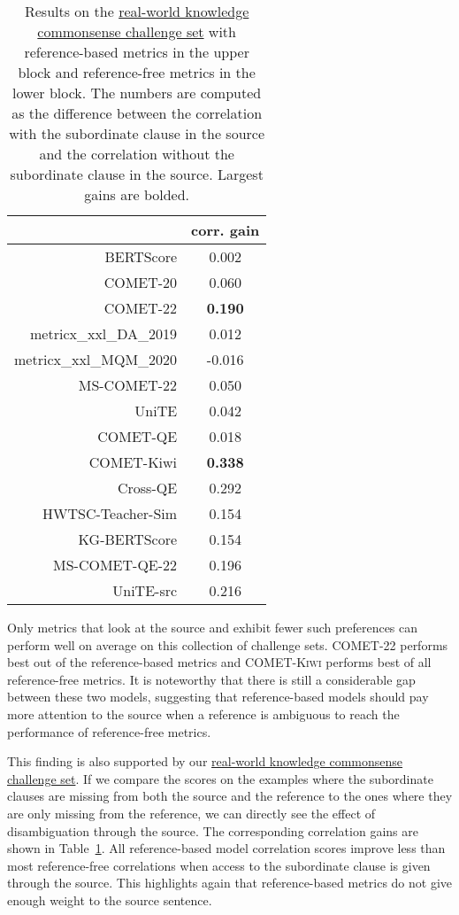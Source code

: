\documentclass[11pt]{article}
\begin{document}
\begin{table}[ht!]
    \centering
    \small
    \begin{tabular}{rc}
\toprule
    & \textbf{corr. gain}\\
\midrule
   BERTScore & 0.002 \\
   COMET-20 & 0.060 \\	
   COMET-22 & \textbf{0.190} \\
   metricx\_xxl\_DA\_2019 & 0.012\\
   metricx\_xxl\_MQM\_2020 & -0.016\\
   MS-COMET-22 & 0.050\\
   UniTE & 0.042\\
\midrule
   COMET-QE & 0.018 \\
   COMET-Kiwi & \textbf{0.338} \\
   Cross-QE & 0.292 \\
   HWTSC-Teacher-Sim & 0.154 \\
   KG-BERTScore & 0.154 \\
   MS-COMET-QE-22 & 0.196 \\
   UniTE-src & 0.216 \\
   \bottomrule
    \end{tabular}
    \caption{Results on the \hyperref[subsec:real-world-commonsense]{real-world knowledge commonsense challenge set} with reference-based metrics in the upper block and reference-free metrics in the lower block. The numbers are computed as the difference between the correlation with the subordinate clause in the source and the correlation without the subordinate clause in the source. Largest gains are bolded.}
    \label{tab:corr_gain}
\end{table}
 
Only metrics that look at the source and exhibit fewer such preferences can perform well on average on this collection of challenge sets. \textsc{COMET-22} performs best out of the reference-based metrics and \textsc{COMET-Kiwi} performs best of all reference-free metrics. It is noteworthy that there is still a considerable gap between these two models, suggesting that reference-based models should pay more attention to the source when a reference is ambiguous to reach the performance of reference-free metrics.


This finding is also supported by our \hyperref[subsec:real-world-commonsense]{real-world knowledge commonsense challenge set}. If we compare the scores on the examples where the subordinate clauses are missing from both the source and the reference to the ones where they are only missing from the reference, we can directly see the effect of disambiguation through the source. The corresponding correlation gains are shown in Table~\ref{tab:corr_gain}. All reference-based model correlation scores improve less than most reference-free correlations when access to the subordinate clause is given through the source. This highlights again that reference-based metrics do not give enough weight to the source sentence.
\end{document}
